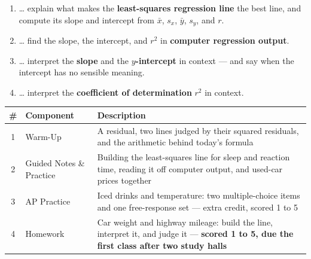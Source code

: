 \documentclass[12pt]{article}
\begin{document}

\namedateperiod
\vspace{0.18in}

\boxguard[14]
\begin{learningtargetbox}
\small
\begin{enumerate}[leftmargin=1.5em, itemsep=5pt]
  \item \ldots{} explain what makes the \textbf{least-squares regression line} the best line,
        and compute its slope and intercept from $\bar x$, $s_x$, $\bar y$, $s_y$, and $r$.
  \item \ldots{} find the slope, the intercept, and $r^2$ in \textbf{computer regression
        output}.
  \item \ldots{} interpret the \textbf{slope} and the \textbf{$y$-intercept} in context ---
        and say when the intercept has no sensible meaning.
  \item \ldots{} interpret the \textbf{coefficient of determination} $r^2$ in context.
\end{enumerate}
\end{learningtargetbox}

\vspace{0.14in}

\boxguard[14]
\begin{tocbox}
\small
\renewcommand{\arraystretch}{1.5}
\begin{tabularx}{\linewidth}{@{} c l X @{}}
\rowcolor{sky}
\textbf{\#} & \textbf{Component} & \textbf{Description} \\
\midrule
1 & Warm-Up & A residual, two lines judged by their squared residuals, and the arithmetic
                 behind today's formula \\
2 & Guided Notes \& Practice & Building the least-squares line for sleep and reaction time,
                 reading it off computer output, and used-car prices together \\
3 & AP Practice & Iced drinks and temperature: two multiple-choice items and one
                 free-response set --- extra credit, scored 1 to 5 \\
4 & Homework & Car weight and highway mileage: build the line, interpret it, and judge it
                 --- \textbf{scored 1 to 5, due the first class after two study halls} \\
\end{tabularx}
\end{tocbox}
\end{document}
